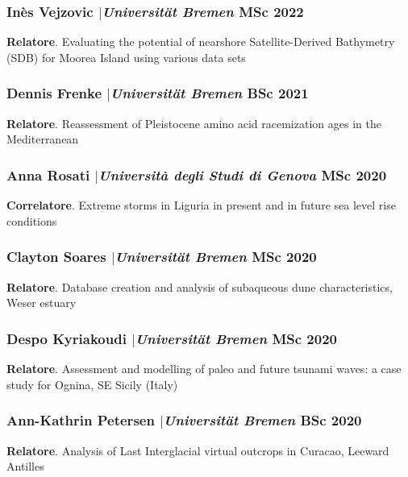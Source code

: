 \documentclass[11pt]{article}
\begin{document}
\smallskip

\subsubsection{Inès Vejzovic $|${\normalfont\textit{Universität Bremen}} \hfill MSc 2022}
{\footnotesize 
\textbf{Relatore}. Evaluating the potential of nearshore Satellite-Derived Bathymetry (SDB) for Moorea Island using various data sets}

\smallskip

\subsubsection{Dennis Frenke $|${\normalfont\textit{Universität Bremen}} \hfill BSc 2021}
{\footnotesize 
\textbf{Relatore}. Reassessment of Pleistocene amino acid racemization ages in the Mediterranean}

\smallskip

\subsubsection{Anna Rosati $|${\normalfont\textit{Università degli Studi di Genova}} \hfill MSc 2020}
{\footnotesize 
\textbf{Correlatore}. Extreme storms in Liguria in present and in future sea level rise conditions}

\smallskip

\subsubsection{Clayton Soares $|${\normalfont\textit{Universität Bremen}} \hfill MSc 2020}
{\footnotesize 
\textbf{Relatore}. Database creation and analysis of subaqueous dune characteristics, Weser estuary}

\smallskip

\subsubsection{Despo Kyriakoudi $|${\normalfont\textit{Universität Bremen}} \hfill MSc 2020}
{\footnotesize 
\textbf{Relatore}. Assessment and modelling of paleo and future tsunami waves: a case study for Ognina, SE Sicily (Italy)}

\smallskip

\subsubsection{Ann-Kathrin Petersen $|${\normalfont\textit{Universität Bremen}} \hfill BSc 2020}
{\footnotesize 
\textbf{Relatore}. Analysis of Last Interglacial virtual outcrops in Curacao, Leeward Antilles}
\end{document}
